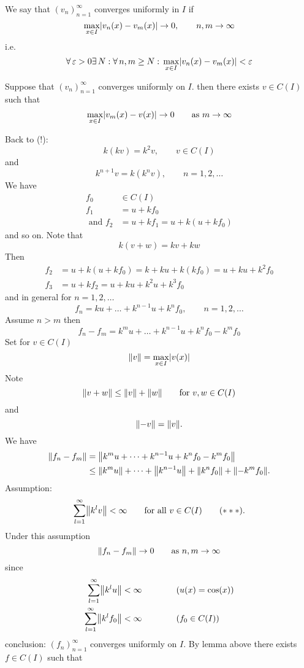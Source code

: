 \begin{enumerate}[1.]
\begin{definition*}
\[		\]
		We say that $(v_n)_{n=1}^{\infty}$ converges uniformly in $I$ if
		\[
			\max_{x \in I} \lvert v_n(x)-v_m(x)\rvert \to 0 , \qquad n,m \to \infty
		\]
		i.e.
		\[
			\forall\, \varepsilon >0 \exists\, N: \forall\, n,m \geq N: \, \max_{x \in I}\lvert v_n(x)-v_m(x)\rvert< \varepsilon
		\]
	\end{definition*}
	\begin{lemma*}
		Suppose that $(v_n)_{n=1}^{\infty}$ converges uniformly on $I$. then there exists $v \in C(I)$ such that
		\[
			 \max_{x \in I}\lvert v_m(x)-v(x)\rvert \to 0 \qquad \text{as }m \to \infty
		\]
	\end{lemma*}
	Back to (!): \\
	\[
		k(kv) = k^2 v, \qquad v \in C(I)
	\]
	and
	\[
		k^{n+1}v = k(k^nv), \qquad n=1,2,\dots
	\]
	We have 
	\begin{align*}
		f_0 & \in C(I) \\ f_1 &=u+kf_0 \\ \text{ and }  
				f_2 &= u + kf_1 = u + k(u+kf_0)
	\end{align*}
	and so on. Note that
	\[
		k(v+w)=kv+kw
	\]
	Then 
	\begin{align*}
		f_2 &= u +k (u+kf_0) = k + ku + k(kf_0) = u + ku +k^2f_0 \\
		f_3 &= u + kf_2 = u + ku + k^2u + k^3f_0
	\end{align*}
	and in general for $n=1,2,\dots$
	\[
		f_n = ku + \dots + k^{n-1}u + k^n f_0, \qquad n=1,2,\dots
	\]
	Assume $n>m$ then
	\[
		f_n-f_m = k^mu + \dots + k^{n-1}u + k^nf_0 - k^mf_0
	\]
	Set for $v \in C(I)$
	\[
		\norm{v} = \max_{x \in I}\abs{v(x)}
	\]
	Note
	\[
		\norm{v+w} \leq \norm{v} + \norm{w} \qquad \text{for }v,w \in C(I)
	\]
	and
	\[
		\norm{-v}=\norm{v}.
	\]
	We have
	\begin{align*}
		\norm{f_n-f_m} &= \norm{k^mu + \dots + k^{n-1}u + k^nf_0 - k^m f_0} \\
		&\leq \norm{k^mu} + \dots + \norm{ k^{n-1}u} + \norm{k^nf_0} + \norm{- k^mf_0}.
	\end{align*}
	Assumption:
	\[
		\sum_{l=1}^{\infty} \norm{k^lv} < \infty \qquad \text{for all }v \in C(I) \qquad (***).
	\]
	Under this assumption
	\[
		\norm{f_n-f_m} \to 0 \qquad \text{as }n,m \to \infty
	\]
	since
	\begin{align*}
		\sum_{l=1}^{\infty}\norm{k^lu} &< \infty \qquad \qquad (u(x)=\cos(x)) \\
		\sum_{l=1}^{\infty}\norm{k^lf_0} &< \infty \qquad \qquad (f_0 \in C(I))
	\end{align*}
	conclusion: $(f_n)_{n=1}^{\infty}$ converges uniformly on $I$. By lemma above there exists $f \in C(I)$ such that

\end{enumerate}
